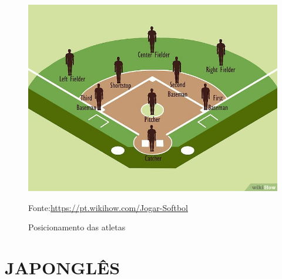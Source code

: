 \begin{figure}[!ht]
	\caption{Posicionamento das atletas}
	\includegraphics[width=.8\textwidth]{fig/v4-728px-Play-Softball-Step-4-Version-3}
	
	\par Fonte:\url{https://pt.wikihow.com/Jogar-Softbol}
\end{figure}


\chapter{JAPONGLÊS}



